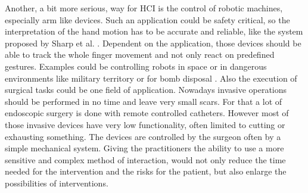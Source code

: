Another, a bit more serious, way for \ac{HCI} is the control of robotic machines, especially arm like devices. Such an application could be safety critical, so the interpretation of the hand motion has to be accurate and reliable, like the system proposed by Sharp et al. \cite{sharp2015accurate}. Dependent on the application, those devices should be able to track the whole finger movement and not only react on predefined gestures. Examples could be controlling robots in space \cite{dipietro2008survey} or in dangerous environments like military territory or for bomb disposal \cite{greenleaf1996developing}. Also the execution of surgical tasks could be one field of application. Nowadays invasive operations should be performed in no time and leave very small scars. For that a lot of endoscopic surgery is done with remote controlled catheters. However most of those invasive devices have very low functionality, often limited to cutting or exhausting something. The devices are controlled by the surgeon often by a simple mechanical system. Giving the practitioners the ability to use a more sensitive and complex method of interaction, would not only reduce the time needed for the intervention and the risks for the patient, but also enlarge the possibilities of interventions.

